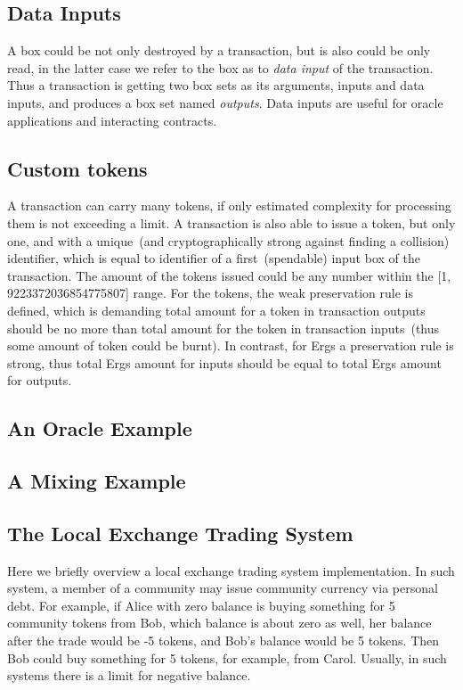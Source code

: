 \subsection{Data Inputs}
 \label{sec:data-inputs}

 A box could be not only destroyed by a transaction, but is also could be only read, in the latter case we refer to the
 box as to {\em data input} of the transaction. Thus a transaction is getting two box sets as its arguments, inputs and
 data inputs, and produces a box set named {\em outputs}. Data inputs are useful for oracle applications and interacting
 contracts.

\subsection{Custom tokens}
 \label{sec:custom tokens}

 A transaction can carry many tokens, if only estimated complexity for processing them is not exceeding a limit. A
 transaction is also able to issue a token, but only one, and with a unique~(and cryptographically strong against
 finding a collision) identifier, which is equal to identifier of a first~(spendable) input box of the transaction.
 The amount of the tokens issued could be any number within the [1, 9223372036854775807] range. For the tokens, the weak
 preservation rule is defined, which is demanding total amount for a token in transaction outputs should be no more
 than total amount for the token in transaction inputs~(thus some amount of token could be burnt). In contrast, for Ergs
 a preservation rule is strong, thus total Ergs amount for inputs should be equal to total Ergs amount for outputs.


\subsection{An Oracle Example}
 \label{sec:platform}

\subsection{A Mixing Example}
 \label{sec:platform}

\subsection{The Local Exchange Trading System}
 \label{sec:platform}

 Here we briefly overview a local exchange trading system implementation. In such system, a member of a community may
 issue community currency via personal debt. For example, if Alice with zero balance is buying something for 5
 community tokens from Bob, which balance is about zero as well, her balance after the trade would be -5 tokens, and
 Bob's balance would be 5 tokens. Then Bob could buy something for 5 tokens, for example, from Carol. Usually, in such
 systems there is a limit for negative balance.

